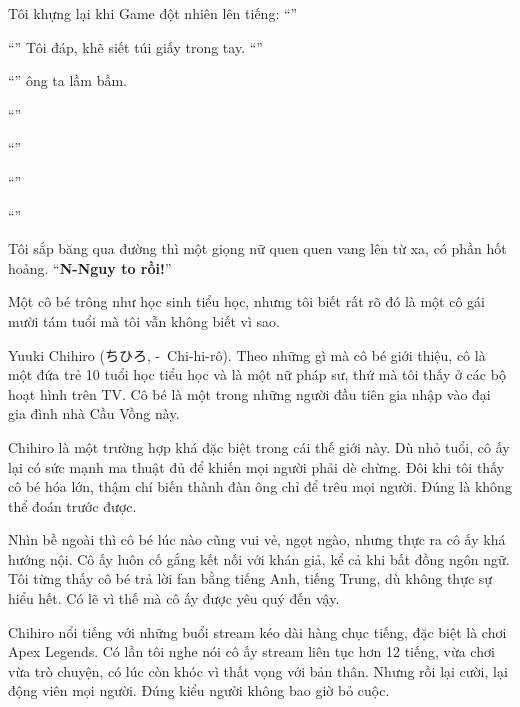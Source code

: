 \documentclass[../main.tex]{subfiles}
\begin{document}
Tôi khựng lại khi Game đột nhiên lên tiếng: ``''

``'' Tôi đáp, khẽ siết túi giấy trong tay. ``''

``'' ông ta lầm bầm.

``''

``''

``''

``''

Tôi sắp băng qua đường thì một giọng nữ quen quen vang lên từ xa, có phần hốt hoảng. ``\textbf{N-Nguy to rồi!}''


Một cô bé trông như học sinh tiểu học, nhưng tôi biết rất rõ đó là một cô gái mười tám tuổi mà tôi vẫn không biết vì sao.

\chrint

Yuuki Chihiro (ちひろ, -\ Chi-hi-rô). Theo những gì mà cô bé giới thiệu, cô là một đứa trẻ 10 tuổi học tiểu học và là một nữ pháp sư, thứ mà tôi thấy ở các bộ hoạt hình trên TV. Cô bé là một trong những người đầu tiên gia nhập vào đại gia đình nhà Cầu Vồng này.

Chihiro là một trường hợp khá đặc biệt trong cái thế giới này. Dù nhỏ tuổi, cô ấy lại có sức mạnh ma thuật đủ để khiến mọi người phải dè chừng. Đôi khi tôi thấy cô bé hóa lớn, thậm chí biến thành đàn ông chỉ để trêu mọi người. Đúng là không thể đoán trước được.

Nhìn bề ngoài thì cô bé lúc nào cũng vui vẻ, ngọt ngào, nhưng thực ra cô ấy khá hướng nội. Cô ấy luôn cố gắng kết nối với khán giả, kể cả khi bất đồng ngôn ngữ. Tôi từng thấy cô bé trả lời fan bằng tiếng Anh, tiếng Trung, dù không thực sự hiểu hết. Có lẽ vì thế mà cô ấy được yêu quý đến vậy.

Chihiro nổi tiếng với những buổi stream kéo dài hàng chục tiếng, đặc biệt là chơi Apex Legends. Có lần tôi nghe nói cô ấy stream liên tục hơn 12 tiếng, vừa chơi vừa trò chuyện, có lúc còn khóc vì thất vọng với bản thân. Nhưng rồi lại cười, lại động viên mọi người. Đúng kiểu người không bao giờ bỏ cuộc.
\end{document}
